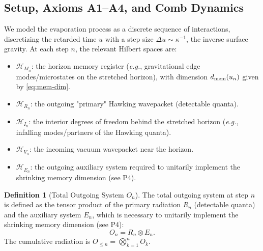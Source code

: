 \documentclass[aps,prd,preprint,onecolumn,superscriptaddress,nofootinbib,longbibliography,floatfix,11pt,showpacs,showkeys]{revtex4-2}
\newcommand{\eg}{\textit{e.g.}\xspace}
\theoremstyle{plain}
\theoremstyle{definition}
\newtheorem{definition}[theorem]{Definition}
\theoremstyle{remark}
\begin{document}
\subsection{Setup, Axioms A1--A4, and Comb Dynamics}\label{sec:comb-setup}\label{sec:setup}
\label{sec:formalism}
We model the evaporation process as a discrete sequence of interactions, discretizing the retarded time $u$ with a step size $\Delta u \sim \kappa^{-1}$, the inverse surface gravity. At each step $n$, the relevant Hilbert spaces are:
\begin{itemize}
    \item $\mathcal{H}_{M_n}$: the horizon memory register (\eg, gravitational edge modes/microstates on the stretched horizon), with dimension $d_{\rm mem}(u_n)$ given by \eqref{eq:mem-dim}.
    \item $\mathcal{H}_{R_n}$: the outgoing "primary" Hawking wavepacket (detectable quanta).
    \item $\mathcal{H}_{I_n}$: the interior degrees of freedom behind the stretched horizon (\eg, infalling modes/partners of the Hawking quanta).
    \item $\mathcal{H}_{V_n}$: the incoming vacuum wavepacket near the horizon.
    \item $\mathcal{H}_{E_n}$: the outgoing auxiliary system required to unitarily implement the shrinking memory dimension (see P4).
\end{itemize}

\begin{definition}[Total Outgoing System $O_n$]
The total outgoing system at step $n$ is defined as the tensor product of the primary radiation $R_n$ (detectable quanta) and the auxiliary system $E_n$, which is necessary to unitarily implement the shrinking memory dimension (see P4):
\begin{equation}
    O_n = R_n \otimes E_n.
\end{equation}
The cumulative radiation is $O_{\le n}=\bigotimes_{k=1}^n O_k$.
\end{definition}
\end{document}
